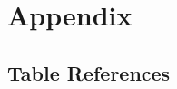 \documentclass[twocolumn]{aastex631}
\begin{document}

\newpage
\appendix
\section{Appendix}



\subsection{Table References}

\end{document}
